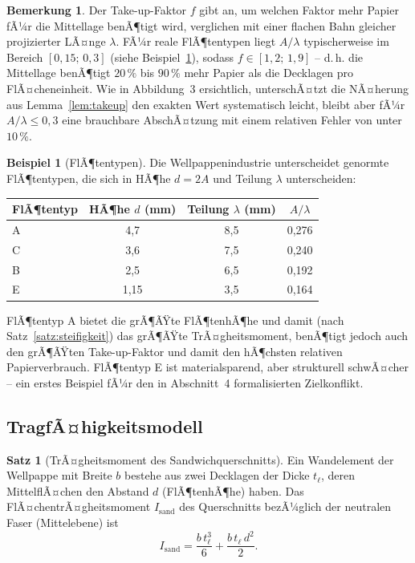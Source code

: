 ﻿\documentclass[a4paper,12pt]{article}
\theoremstyle{definition}
\newtheorem{beispiel}{Beispiel}
\newtheorem{satz}{Satz}
\newtheorem{bemerkung}{Bemerkung}
\begin{document}
\begin{bemerkung}
	Der Take-up-Faktor $f$ gibt an, um welchen Faktor mehr Papier fÃ¼r die
	Mittellage benÃ¶tigt wird, verglichen mit einer flachen Bahn gleicher
	projizierter LÃ¤nge $\lambda$. FÃ¼r reale FlÃ¶tentypen liegt
	$A/\lambda$ typischerweise im Bereich $[0{,}15;\,0{,}3]$ (siehe
	Beispiel~\ref{bsp:fluten}), sodass $f \in [1{,}2;\,1{,}9]$ -- d.\,h. die
	Mittellage benÃ¶tigt $20\,\%$ bis $90\,\%$ mehr Papier als die Decklagen pro
	FlÃ¤cheneinheit. Wie in Abbildung~3 ersichtlich, unterschÃ¤tzt die
	NÃ¤herung aus Lemma~\ref{lem:takeup} den exakten Wert systematisch leicht,
	bleibt aber fÃ¼r $A/\lambda \leq 0{,}3$ eine brauchbare AbschÃ¤tzung mit einem
	relativen Fehler von unter $10\,\%$.
\end{bemerkung}

\begin{beispiel}[FlÃ¶tentypen]
	\label{bsp:fluten}
	Die Wellpappenindustrie unterscheidet genormte FlÃ¶tentypen, die sich in
	HÃ¶he $d = 2A$ und Teilung $\lambda$ unterscheiden:

	\begin{center}
	\begin{tabular}{lccc}
		\textbf{FlÃ¶tentyp} & \textbf{HÃ¶he $d$ (mm)} & \textbf{Teilung $\lambda$ (mm)} & \textbf{$A/\lambda$} \\
		\hline
		A & 4{,}7 & 8{,}5 & 0{,}276 \\
		C & 3{,}6 & 7{,}5 & 0{,}240 \\
		B & 2{,}5 & 6{,}5 & 0{,}192 \\
		E & 1{,}15 & 3{,}5 & 0{,}164 \\
	\end{tabular}
	\end{center}

	FlÃ¶tentyp A bietet die grÃ¶ÃŸte FlÃ¶tenhÃ¶he und damit (nach
	Satz~\ref{satz:steifigkeit}) das grÃ¶ÃŸte TrÃ¤gheitsmoment, benÃ¶tigt jedoch
	auch den grÃ¶ÃŸten Take-up-Faktor und damit den hÃ¶chsten relativen
	Papierverbrauch. FlÃ¶tentyp E ist materialsparend, aber strukturell
	schwÃ¤cher -- ein erstes Beispiel fÃ¼r den in Abschnitt~4 formalisierten
	Zielkonflikt.
\end{beispiel}

\subsection{TragfÃ¤higkeitsmodell}

\begin{satz}[TrÃ¤gheitsmoment des Sandwichquerschnitts]
	\label{satz:traegheit}
	Ein Wandelement der Wellpappe mit Breite $b$ bestehe aus zwei Decklagen der
	Dicke $t_\ell$, deren MittelflÃ¤chen den Abstand $d$ (FlÃ¶tenhÃ¶he) haben. Das
	FlÃ¤chentrÃ¤gheitsmoment $I_{\mathrm{sand}}$ des Querschnitts bezÃ¼glich der
	neutralen Faser (Mittelebene) ist
	\[
		I_{\mathrm{sand}} = \frac{b\,t_\ell^3}{6} + \frac{b\,t_\ell\,d^2}{2}.
	\]
\end{satz}
\end{document}
